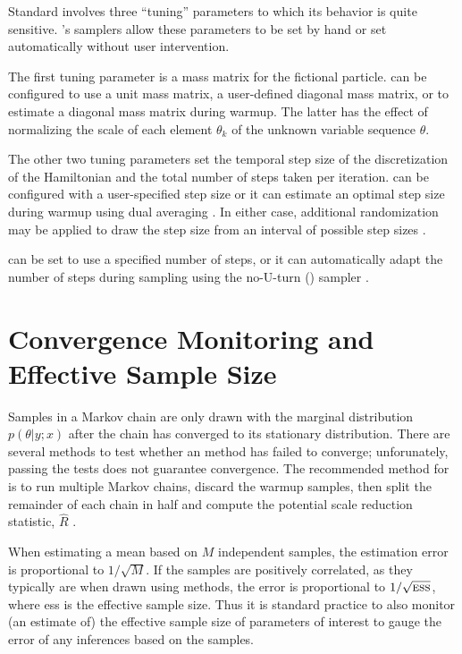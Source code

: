 Standard \HMC involves three ``tuning'' parameters to which its
behavior is quite sensitive.  \Stan's samplers allow these parameters
to be set by hand or set automatically without user intervention.

The first tuning parameter is a mass matrix for the fictional
particle.  \Stan can be configured to use a unit mass matrix, a
user-defined diagonal mass matrix, or to estimate a diagonal mass
matrix during warmup.  The latter has the effect of normalizing the
scale of each element $\theta_k$ of the unknown variable sequence
$\theta$.

The other two tuning parameters set the temporal step size of the
discretization of the Hamiltonian and the total number of steps taken
per iteration.  \Stan can be configured with a user-specified step
size or it can estimate an optimal step size during warmup using dual
averaging \citep{Hoffman-Gelman:2012}.  In either case, additional
randomization may be applied to draw the step size from an interval of
possible step sizes \citep{Neal:2011}.

\Stan can be set to use a specified number of steps, or it can
automatically adapt the number of steps during sampling using the
no-U-turn (\NUTS) sampler \citep{Hoffman-Gelman:2012}.  


\section{Convergence Monitoring and Effective Sample Size}

Samples in a Markov chain are only drawn with the marginal
distribution $p(\theta|y;x)$ after the chain has converged to its
stationary distribution.  There are several methods to test whether an
\MCMC method has failed to converge; unforunately, passing the tests
does not guarantee convergence.  The recommended method for \Stan is
to run multiple Markov chains, discard the warmup samples, then split
the remainder of each chain in half and compute the potential scale
reduction statistic, $\hat{R}$ \citep{GelmanRubin:1992}.

When estimating a mean based on $M$ independent samples, the
estimation error is proportional to $1/\sqrt{M}$.  If the samples are
positively correlated, as they typically are when drawn using \MCMC
methods, the error is proportional to $1/\sqrt{\mbox{\sc ess}}$, where
{\sc ess} is the effective sample size.  Thus it is standard practice
to also monitor (an estimate of) the effective sample size of
parameters of interest to gauge the error of any inferences based on
the samples.




